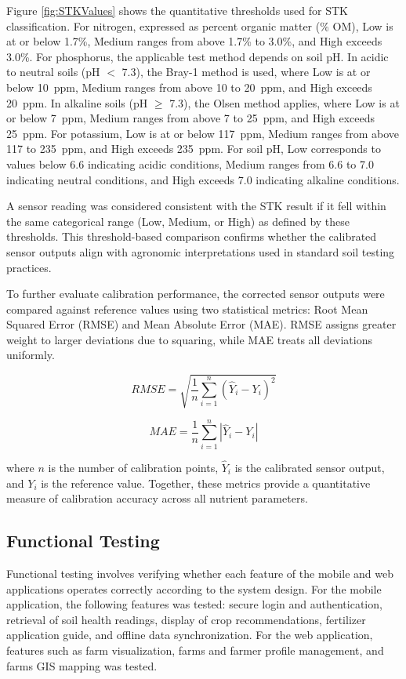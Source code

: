 {	Figure \ref{fig:STKValues} shows the quantitative thresholds used for STK classification. 
	For nitrogen, expressed as percent organic matter (\% OM), Low is at or below 1.7\%, 
	Medium ranges from above 1.7\% to 3.0\%, and High exceeds 3.0\%. For phosphorus, 
	the applicable test method depends on soil pH. In acidic to neutral soils (pH $<$ 7.3), 
	the Bray-1 method is used, where Low is at or below 10~ppm, Medium ranges from above 
	10 to 20~ppm, and High exceeds 20~ppm. In alkaline soils (pH $\geq$ 7.3), the Olsen 
	method applies, where Low is at or below 7~ppm, Medium ranges from above 7 to 25~ppm, 
	and High exceeds 25~ppm. For potassium, Low is at or below 117~ppm, Medium ranges 
	from above 117 to 235~ppm, and High exceeds 235~ppm. For soil pH, Low corresponds 
	to values below 6.6 indicating acidic conditions, Medium ranges from 6.6 to 7.0 
	indicating neutral conditions, and High exceeds 7.0 indicating alkaline conditions.
	
	A sensor reading was considered consistent with the STK result if it fell within the 
	same categorical range (Low, Medium, or High) as defined by these thresholds. This 
	threshold-based comparison confirms whether the calibrated sensor outputs align with 
	agronomic interpretations used in standard soil testing practices.
	
	To further evaluate calibration performance, the corrected sensor outputs were compared 
	against reference values using two statistical metrics: Root Mean Squared Error (RMSE) 
	and Mean Absolute Error (MAE). RMSE assigns greater weight to larger deviations due 
	to squaring, while MAE treats all deviations uniformly.
	
	\[
	RMSE = \sqrt{\frac{1}{n} \sum_{i=1}^{n} (\hat{Y}_i - Y_i)^2}
	\]
	
	\[
	MAE = \frac{1}{n} \sum_{i=1}^{n} \left| \hat{Y}_i - Y_i \right|
	\]
	
	where $n$ is the number of calibration points, $\hat{Y}_i$ is the calibrated sensor 
	output, and $Y_i$ is the reference value. Together, these metrics provide a quantitative 
	measure of calibration accuracy across all nutrient parameters.
	
	\subsection{Functional Testing}
	Functional testing involves verifying whether each feature of the mobile and web applications operates correctly according to the system design. For the mobile application, the following features was tested: secure login and authentication, retrieval of soil health readings, display of crop recommendations, fertilizer application guide, and offline data synchronization. For the web application, features such as farm visualization, farms and farmer profile management, and farms GIS mapping was tested.
	
}
